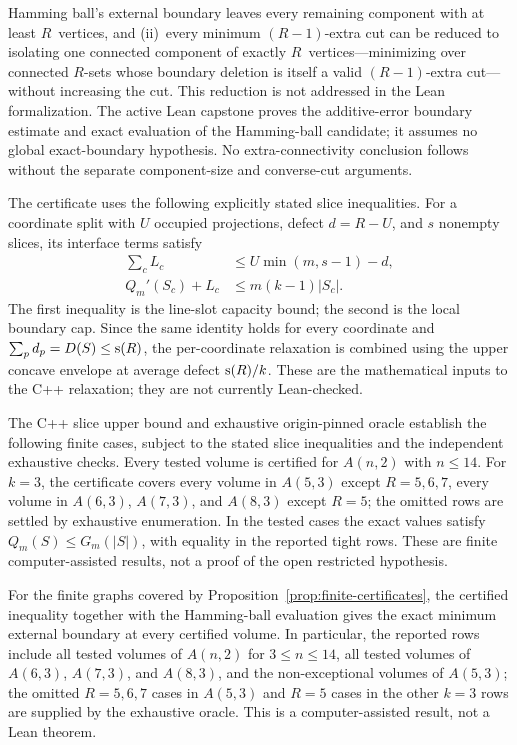 \begin{remark}
Hamming ball's external boundary leaves every remaining component with at least
$R$~vertices, and (ii)~every minimum $(R{-}1)$-extra cut can be reduced to
isolating one connected component of exactly $R$~vertices---minimizing over
connected $R$-sets whose boundary deletion is itself a valid $(R{-}1)$-extra
cut---without increasing the cut. This reduction is not addressed in the Lean
formalization. The active Lean capstone proves the additive-error boundary
estimate and exact evaluation of the Hamming-ball candidate; it assumes no
global exact-boundary hypothesis. No extra-connectivity conclusion follows
without the separate component-size and converse-cut arguments.
\end{remark}

\begin{proposition}\label{prop:finite-certificates}
The certificate uses the following explicitly stated slice inequalities.  For a
coordinate split with $U$ occupied projections, defect $d=R-U$, and $s$
nonempty slices, its interface terms satisfy
\begin{align}
 \sum_c L_c &\le U\min(m,s-1)-d, \label{eq:line-slot-capacity}\\
 Q_m'(S_c)+L_c &\le m(k-1)|S_c|. \label{eq:local-capacity}
\end{align}
The first inequality is the line-slot capacity bound; the second is the local
boundary cap.  Since the same identity holds for every coordinate and
$\sum_p d_p=D(S)\le \mathrm{s}(R)$, the per-coordinate relaxation is combined using
the upper concave envelope at average defect $\mathrm{s}(R)/k$.  These are the
mathematical inputs to the C++ relaxation; they are not currently Lean-checked.

The C++ slice upper bound and exhaustive origin-pinned oracle establish the
following finite cases, subject to the stated slice inequalities and the
independent exhaustive checks. Every tested volume is certified for
$A(n,2)$ with $n\le14$. For $k=3$, the certificate covers every volume in
$A(5,3)$ except $R=5,6,7$, every volume in $A(6,3)$, $A(7,3)$, and $A(8,3)$
except $R=5$; the omitted rows are settled by exhaustive enumeration. In the
tested cases the exact values satisfy $Q_m(S)\le G_m(|S|)$, with equality in
the reported tight rows. These are finite computer-assisted results, not a
proof of the open restricted hypothesis.
\end{proposition}

\begin{corollary}
For the finite graphs covered by Proposition~\ref{prop:finite-certificates},
the certified inequality together with the Hamming-ball evaluation gives the
exact minimum external boundary at every certified volume.  In particular,
the reported rows include all tested volumes of $A(n,2)$ for $3\le n\le14$,
all tested volumes of $A(6,3)$, $A(7,3)$, and $A(8,3)$, and the non-exceptional
volumes of $A(5,3)$; the omitted $R=5,6,7$ cases in $A(5,3)$ and $R=5$ cases
in the other $k=3$ rows are supplied by the exhaustive oracle.
This is a computer-assisted result, not a Lean theorem.
\end{corollary}

